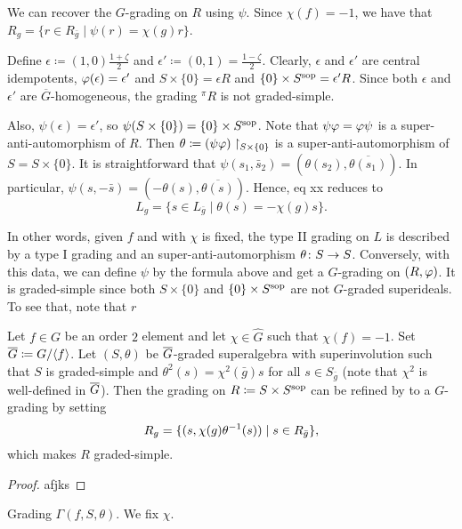 We can recover the $G$-grading on $R$ using $\psi$. 
Since $\chi(f) = -1$, we have that $R_g = \{ r \in R_{\bar g} \mid \psi(r) = \chi(g)r \}$. 

Define $\epsilon \coloneqq (1,0) \frac{1+\zeta}{2}$ and $\epsilon' \coloneqq (0, 1) = \frac{1-\zeta}{2}$. 
Clearly, $\epsilon$ and $\epsilon'$ are central idempotents,  $\varphi(\epsilon) = \epsilon'$ and $S\times \{ 0 \} = \epsilon R$ and $\{ 0 \} \times S^{\mathrm{sop}} = \epsilon' R$. 
Since both $\epsilon$ and $\epsilon'$ are $\overline{G}$-homogeneous, the grading ${}^\pi R$ is not graded-simple. 

Also, $\psi(\epsilon) = \epsilon'$, so $\psi(S\times \{ 0 \}) = \{ 0 \} \times S^{\mathrm{sop}}$. 
Note that $\psi \varphi = \varphi \psi$ is a super-anti-automorphism of $R$. 
Then $\theta \coloneqq (\psi \varphi)\restriction_{S\times \{ 0 \}}$ is a super-anti-automorphism of $S = S\times \{0 \}$. 
It is straightforward that $\psi(s_1, \bar s_2) = ( \theta(s_2), \overline{\theta(s_1)})$. 
In particular, $\psi( s, - \bar s) = ( -\theta(s), \overline{\theta(s)})$. 
Hence, eq xx reduces to 
\[
    L_g = \{ s \in L_{\bar g} \mid \theta(s) = - \chi(g) s\}.
\]

In other words, given $f$ and with $\chi$ is fixed, the type II grading on $L$ is described by a type I grading and an super-anti-automorphism $\theta\colon S \to S$. 
Conversely, with this data, we can define $\psi$ by the formula above and get a $G$-grading on $(R, \varphi)$. 
It is graded-simple since both $S \times \{ 0 \}$ and $\{ 0 \} \times S^{\mathrm{sop}}$ are not $G$-graded superideals. 
To see that, note that $r $

\begin{lemma}
    Let $f \in G$ be an order $2$ element and let $\chi\in \widehat G$ such that $\chi(f) = -1$. 
    Set $\barr G \coloneqq G/ \langle f \rangle$. 
    Let $(S, \theta)$ be $\barr G$-graded superalgebra with superinvolution such that $S$ is graded-simple and $\theta^2(s) = \chi^2(\bar g) s$ for all $s\in S_{\bar g}$ (note that $\chi^2$ is well-defined in $\barr G$). 
    Then the grading on $R \coloneqq S \times S^{\mathrm{sop}}$ can be refined by to a $G$-grading by setting 
    \[
        R_g = \{ (s, \chi(g) \theta^{-1}(s)) \mid s \in R_{\bar g}\},
    \]
    which makes $R$ graded-simple.
\end{lemma}

\begin{proof}
    afjks
\end{proof}

\begin{defi}
    Grading $\Gamma(f, S, \theta)$. 
    We fix $\chi$. 
\end{defi}

